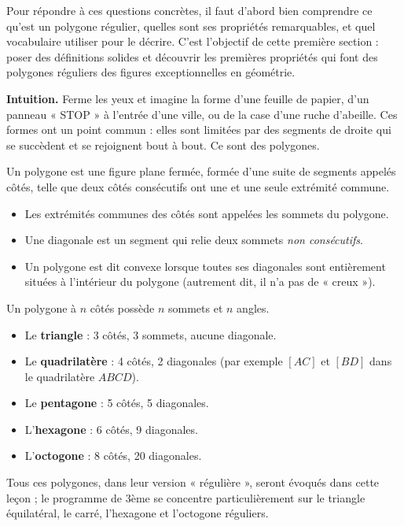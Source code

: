 \documentclass[11pt]{article}
\newcommand{\cle}[1]{{\popxbold\color{popdark}#1}}
\newcounter{popsec}
\newcounter{popsub}
\newcommand{\courssub}[1]{%
  \stepcounter{popsub}%
  \par\vspace{9pt}\noindent{\popxbold\fontsize{11.5}{13}\selectfont\color{popink}{\color{poporange}\thepopsec.\thepopsub}\hspace{6pt}#1}\par\nopagebreak\vspace{4pt}
}
\begin{document}
Pour répondre à ces questions concrètes, il faut d'abord bien comprendre ce qu'est un polygone régulier, quelles sont ses propriétés remarquables, et quel vocabulaire utiliser pour le décrire. C'est l'objectif de cette première section : poser des définitions solides et découvrir les premières propriétés qui font des polygones réguliers des figures exceptionnelles en géométrie.

\courssub{Qu'est-ce qu'un polygone ?}

\textbf{Intuition.} Ferme les yeux et imagine la forme d'une feuille de papier, d'un panneau « STOP » à l'entrée d'une ville, ou de la case d'une ruche d'abeille. Ces formes ont un point commun : elles sont limitées par des segments de droite qui se succèdent et se rejoignent bout à bout. Ce sont des \cle{polygones}.

\begin{definition}[Polygone]
Un \cle{polygone} est une figure plane fermée, formée d'une suite de segments appelés \cle{côtés}, telle que deux côtés consécutifs ont une et une seule extrémité commune.
\begin{itemize}
\item Les extrémités communes des côtés sont appelées les \cle{sommets} du polygone.
\item Une \cle{diagonale} est un segment qui relie deux sommets \emph{non consécutifs}.
\item Un polygone est dit \cle{convexe} lorsque toutes ses diagonales sont entièrement situées à l'intérieur du polygone (autrement dit, il n'a pas de « creux »).
\end{itemize}
Un polygone à $n$ côtés possède $n$ sommets et $n$ angles.
\end{definition}

\begin{exemplebox}
\begin{itemize}
\item Le \textbf{triangle} : 3 côtés, 3 sommets, aucune diagonale.
\item Le \textbf{quadrilatère} : 4 côtés, 2 diagonales (par exemple $[AC]$ et $[BD]$ dans le quadrilatère $ABCD$).
\item Le \textbf{pentagone} : 5 côtés, 5 diagonales.
\item L'\textbf{hexagone} : 6 côtés, 9 diagonales.
\item L'\textbf{octogone} : 8 côtés, 20 diagonales.
\end{itemize}
Tous ces polygones, dans leur version « régulière », seront évoqués dans cette leçon ; le programme de 3ème se concentre particulièrement sur le triangle équilatéral, le carré, l'hexagone et l'octogone réguliers.
\end{exemplebox}
\end{document}
